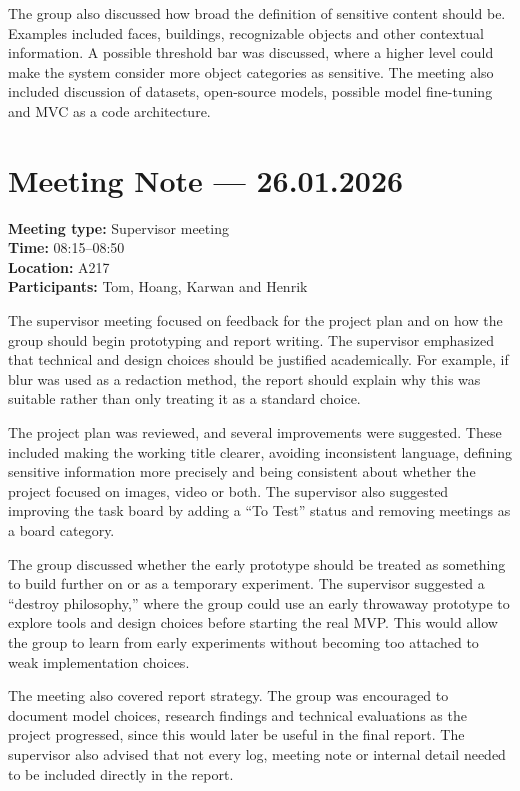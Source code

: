The group also discussed how broad the definition of sensitive content should be. Examples included faces, buildings, recognizable objects and other contextual information. A possible threshold bar was discussed, where a higher level could make the system consider more object categories as sensitive. The meeting also included discussion of datasets, open-source models, possible model fine-tuning and MVC as a code architecture.

\section{Meeting Note --- 26.01.2026}
\label{app:meeting-2026-01-26}
\textbf{Meeting type:} Supervisor meeting\\
\textbf{Time:} 08:15--08:50\\
\textbf{Location:} A217\\
\textbf{Participants:} Tom, Hoang, Karwan and Henrik

The supervisor meeting focused on feedback for the project plan and on how the group should begin prototyping and report writing. The supervisor emphasized that technical and design choices should be justified academically. For example, if blur was used as a redaction method, the report should explain why this was suitable rather than only treating it as a standard choice.

The project plan was reviewed, and several improvements were suggested. These included making the working title clearer, avoiding inconsistent language, defining sensitive information more precisely and being consistent about whether the project focused on images, video or both. The supervisor also suggested improving the task board by adding a ``To Test'' status and removing meetings as a board category.

The group discussed whether the early prototype should be treated as something to build further on or as a temporary experiment. The supervisor suggested a ``destroy philosophy,'' where the group could use an early throwaway prototype to explore tools and design choices before starting the real MVP. This would allow the group to learn from early experiments without becoming too attached to weak implementation choices.

The meeting also covered report strategy. The group was encouraged to document model choices, research findings and technical evaluations as the project progressed, since this would later be useful in the final report. The supervisor also advised that not every log, meeting note or internal detail needed to be included directly in the report.

